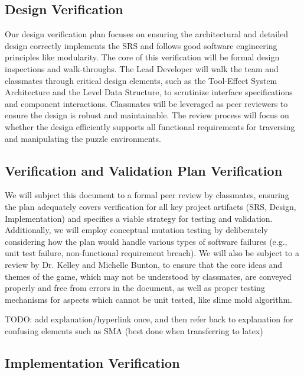 \documentclass[12pt, titlepage]{article}
\begin{document}
\subsection{Design Verification}

Our design verification plan focuses on ensuring the architectural and detailed design correctly implements the SRS and follows good software engineering principles like modularity. The core of this verification will be formal design inspections and walk-throughs. The Lead Developer will walk the team and classmates through critical design elements, such as the Tool-Effect System Architecture and the Level Data Structure, to scrutinize interface specifications and component interactions. Classmates will be leveraged as peer reviewers to ensure the design is robust and maintainable. The review process will focus on whether the design efficiently supports all functional requirements for traversing and manipulating the puzzle environments.

\subsection{Verification and Validation Plan Verification}

We will subject this document to a formal peer review by classmates, ensuring the plan adequately covers verification for all key project artifacts (SRS, Design, Implementation) and specifies a viable strategy for testing and validation. Additionally, we will employ conceptual mutation testing by deliberately considering how the plan would handle various types of software failures (e.g., unit test failure, non-functional requirement breach). We will also be subject to a review by Dr. Kelley and Michelle Bunton, to ensure that the core ideas and themes of the game, which may not be understood by classmates, are conveyed properly and free from errors in the document, as well as proper testing mechanisms for aspects which cannot be unit tested, like slime mold algorithm.

TODO: add explanation/hyperlink once, and then refer back to explanation for confusing elements such as SMA (best done when transferring to latex)

\subsection{Implementation Verification}
\end{document}
